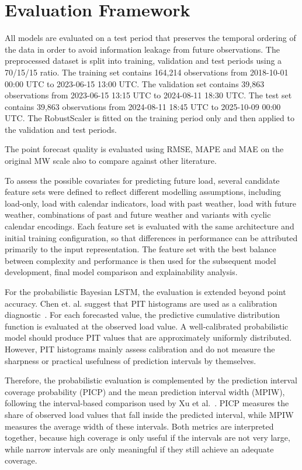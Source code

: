 \documentclass[Master,english,IEEE]{twbook}
\begin{document}
\section{Evaluation Framework}

All models are evaluated on a test period that preserves the temporal ordering of the data in order to avoid information leakage from future observations. The preprocessed dataset is split into training, validation and test periods using a 70/15/15 ratio. The training set contains 164,214 observations from 2018-10-01 00:00 UTC to 2023-06-15 13:00 UTC. The validation set contains 39,863 observations from 2023-06-15 13:15 UTC to 2024-08-11 18:30 UTC. The test set contains 39,863 observations from 2024-08-11 18:45 UTC to 2025-10-09 00:00 UTC. The RobustScaler is fitted on the training period only and then applied to the validation and test periods.

The point forecast quality is evaluated using RMSE, MAPE and MAE on the original MW scale also to compare against other literature.

To assess the possible covariates for predicting future load, several candidate feature sets were defined to reflect different modelling assumptions, including load-only, load with calendar indicators, load with past weather, load with future weather, combinations of past and future weather and variants with cyclic calendar encodings. Each feature set is evaluated with the same architecture and initial training configuration, so that differences in performance can be attributed primarily to the input representation. The feature set with the best balance between complexity and performance is then used for the subsequent model development, final model comparison and explainability analysis.

For the probabilistic Bayesian LSTM, the evaluation is extended beyond point accuracy. Chen et. al. suggest that PIT histograms are used as a calibration diagnostic~\cite{chenEvaluationProbabilisticElectricity2024}. For each forecasted value, the predictive cumulative distribution function is evaluated at the observed load value. A well-calibrated probabilistic model should produce PIT values that are approximately uniformly distributed. However, PIT histograms mainly assess calibration and do not measure the sharpness or practical usefulness of prediction intervals by themselves.

Therefore, the probabilistic evaluation is complemented by the prediction interval coverage probability (PICP) and the mean prediction interval width (MPIW), following the interval-based comparison used by Xu et al.~\cite{xuProbabilisticElectricalLoad2022}. PICP measures the share of observed load values that fall inside the predicted interval, while MPIW measures the average width of these intervals. Both metrics are interpreted together, because high coverage is only useful if the intervals are not very large, while narrow intervals are only meaningful if they still achieve an adequate coverage.
\end{document}
